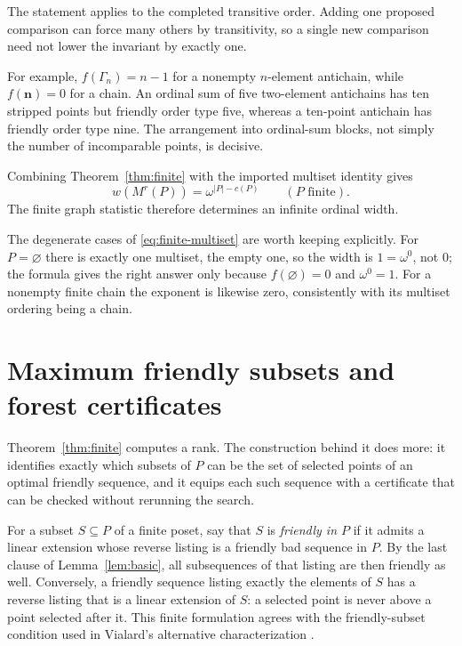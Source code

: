 \documentclass[11pt,letterpaper]{article}
\theoremstyle{definition}
\theoremstyle{remark}
\newcommand{\chain}[1]{\mathbf{#1}}
\newcommand{\anti}[1]{\Gamma_{#1}}
\begin{document}
The statement applies to the completed transitive order. Adding one proposed
comparison can force many others by transitivity, so a single new
comparison need not lower the invariant by exactly one.

For example, $f(\anti n)=n-1$ for a nonempty $n$-element antichain, while
$f(\chain n)=0$ for a chain. An ordinal sum of five two-element antichains
has ten stripped points but friendly order type five, whereas a ten-point
antichain has friendly order type nine. The arrangement into ordinal-sum
blocks, not simply the number of incomparable points, is decisive.

Combining Theorem~\ref{thm:finite} with the imported multiset identity gives
\begin{equation}\label{eq:finite-multiset}
 w(M^r(P))=\omega^{|P|-c(P)}
 \qquad(P\text{ finite}).
\end{equation}
The finite graph statistic therefore determines an infinite ordinal width.

The degenerate cases of \eqref{eq:finite-multiset} are worth keeping
explicitly. For $P=\varnothing$ there is exactly one multiset, the empty
one, so the width is $1=\omega^0$, not $0$; the formula gives the right
answer only because $f(\varnothing)=0$ and $\omega^0=1$. For a nonempty
finite chain the exponent is likewise zero, consistently with its multiset
ordering being a chain.

\section{Maximum friendly subsets and forest certificates}\label{sec:subsets}

Theorem~\ref{thm:finite} computes a rank. The construction behind it does
more: it identifies exactly which subsets of $P$ can be the set of selected
points of an optimal friendly sequence, and it equips each such sequence
with a certificate that can be checked without rerunning the search.

For a subset $S\subseteq P$ of a finite poset, say that $S$ is
\emph{friendly in $P$} if it admits a linear extension whose reverse listing
is a friendly bad sequence in $P$. By the last clause of
Lemma~\ref{lem:basic}, all subsequences of that listing are then friendly as
well. Conversely, a friendly sequence listing exactly the elements of $S$
has a reverse listing that is a linear extension of $S$: a selected point is
never above a point selected after it. This finite formulation agrees with
the friendly-subset condition used in Vialard's alternative
characterization \cite[Definition~4.4]{Vialard2023}.
\end{document}
